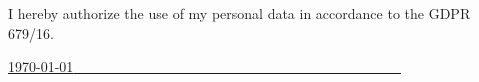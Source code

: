 \documentclass[a4paper,11pt]{article}
\begin{document}
\headerfontx %

\header
\InformationII %
\Degree
\Languages
\Skills
\Experience
\Extra
\Honors

\vfill
\footnotesize{
    \hfill I hereby authorize the use of my personal data in accordance to the GDPR 679/16. \\
}
\vspace{2mm}

\hfill \underline{\normalsize{\today} \textcolor{white}{...................................................................................}}

\end{document}

